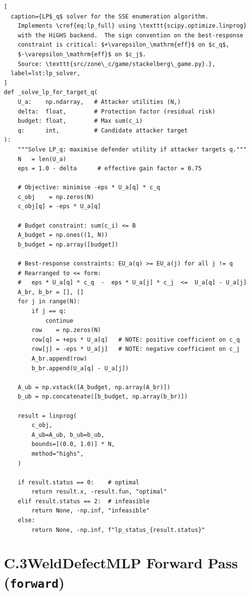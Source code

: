 \begin{lstlisting}[
  caption={LP$_q$ solver for the SSE enumeration algorithm.
    Implements \cref{eq:lp_full} using \texttt{scipy.optimize.linprog}
    with the HiGHS backend.  The sign convention on the best-response
    constraint is critical: $+\varepsilon_\mathrm{eff}$ on $c_q$,
    $-\varepsilon_\mathrm{eff}$ on $c_j$.
    Source: \texttt{src/zone\_c/game/stackelberg\_game.py}.},
  label=lst:lp_solver,
]
def _solve_lp_for_target_q(
    U_a:    np.ndarray,   # Attacker utilities (N,)
    delta:  float,        # Protection factor (residual risk)
    budget: float,        # Max sum(c_i)
    q:      int,          # Candidate attacker target
):
    """Solve LP_q: maximise defender utility if attacker targets q."""
    N   = len(U_a)
    eps = 1.0 - delta      # effective gain factor = 0.75

    # Objective: minimise -eps * U_a[q] * c_q
    c_obj    = np.zeros(N)
    c_obj[q] = -eps * U_a[q]

    # Budget constraint: sum(c_i) <= B
    A_budget = np.ones((1, N))
    b_budget = np.array([budget])

    # Best-response constraints: EU_a(q) >= EU_a(j) for all j != q
    # Rearranged to <= form:
    #   eps * U_a[q] * c_q  -  eps * U_a[j] * c_j  <=  U_a[q] - U_a[j]
    A_br, b_br = [], []
    for j in range(N):
        if j == q:
            continue
        row    = np.zeros(N)
        row[q] = +eps * U_a[q]   # NOTE: positive coefficient on c_q
        row[j] = -eps * U_a[j]   # NOTE: negative coefficient on c_j
        A_br.append(row)
        b_br.append(U_a[q] - U_a[j])

    A_ub = np.vstack([A_budget, np.array(A_br)])
    b_ub = np.concatenate([b_budget, np.array(b_br)])

    result = linprog(
        c_obj,
        A_ub=A_ub, b_ub=b_ub,
        bounds=[(0.0, 1.0)] * N,
        method="highs",
    )

    if result.status == 0:    # optimal
        return result.x, -result.fun, "optimal"
    elif result.status == 2:  # infeasible
        return None, -np.inf, "infeasible"
    else:
        return None, -np.inf, f"lp_status_{result.status}"
\end{lstlisting}

\section*{C.3\quad WeldDefectMLP Forward Pass (\texttt{forward})}

